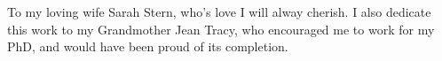 To my loving wife Sarah Stern, who's love I will alway cherish.
I also dedicate this work to my Grandmother Jean Tracy, who encouraged me to work for my PhD, and would have been proud of its completion.

